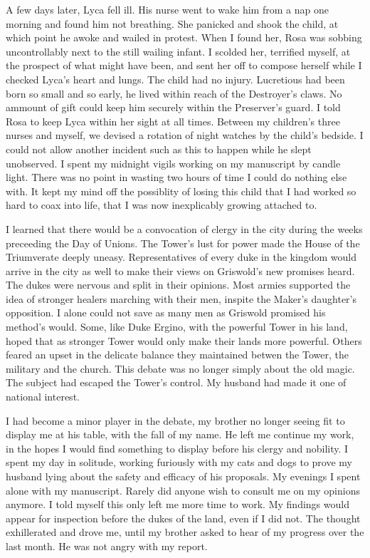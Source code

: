 \documentclass{article}
\begin{document}
A few days later, Lyca fell ill. His nurse went to wake him from a nap one morning and found him not breathing. She panicked and shook the child, at which point he awoke and wailed in protest. When I found her, Rosa was sobbing uncontrollably next to the still wailing infant. I scolded her, terrified myself, at the prospect of what might have been, and sent her off to compose herself while I checked Lyca's heart and lungs. The child had no injury. Lucretious had been born so small and so early, he lived within reach of the Destroyer's claws. No ammount of gift could keep him securely within the Preserver's guard. I told Rosa to keep Lyca within her sight at all times. Between my children's three nurses and myself, we devised a rotation of night watches by the child's bedside. I could not allow another incident such as this to happen while he slept unobserved. I spent my midnight vigils working on my manuscript by candle light. There was no point in wasting two hours of time I could do nothing else with. It kept my mind off the possiblity of losing this child that I had worked so hard to coax into life, that I was now inexplicably growing attached to.

I learned that there would be a convocation of clergy in the city during the weeks preceeding the Day of Unions. The Tower's lust for power made the House of the Triumverate deeply uneasy. Representatives of every duke in the kingdom would arrive in the city as well to make their views on Griswold's new promises heard. The dukes were nervous and split in their opinions. Most armies supported the idea of stronger healers marching with their men, inspite the Maker's daughter's opposition. I alone could not save as many men as Griswold promised his method's would.  Some, like Duke Ergino, with the powerful Tower in his land, hoped that as stronger Tower would only make their lands more powerful. Others feared an upset in the delicate balance they maintained betwen the Tower, the military and the church. This debate was no longer simply about the old magic. The subject had escaped the Tower's control. My husband had made it one of national interest. 

I had become  a minor player in the debate, my brother no longer seeing fit to display me at his table, with the fall of my name. He left me continue my work, in the hopes I would find something to display before his clergy and nobility. I spent my day in solitude, working furiously with my cats and dogs to prove my husband lying about the safety and efficacy of his proposals. My evenings I spent alone with my manuscript. Rarely did anyone wish to consult me on my opinions anymore. I told myself this only left me more time to work. My findings would appear for inspection before the dukes of the land, even if I did not. The thought exhillerated and drove me, until my brother asked to hear of my progress over the last month. He was not angry with my report.
\end{document}
